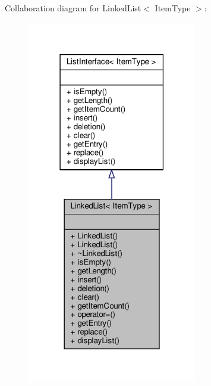 Collaboration diagram for Linked\+List$<$ Item\+Type $>$\+:\nopagebreak
\begin{figure}[H]
\begin{center}
\leavevmode
\includegraphics[width=210pt]{classLinkedList__coll__graph}
\end{center}
\end{figure}
